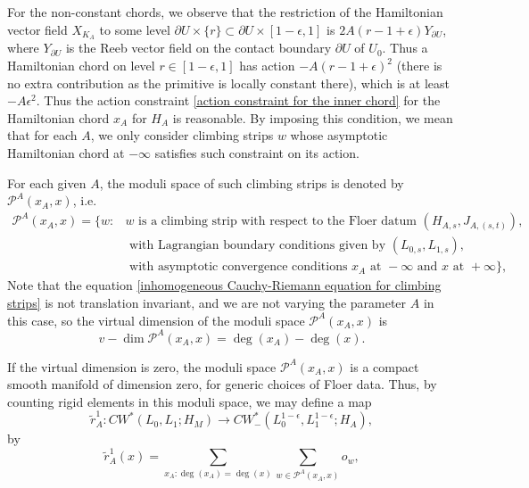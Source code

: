 \documentclass{amsart}
\numberwithin{equation}{section}
\numberwithin{figure}{section}
\begin{document}
For the non-constant chords, we observe that the restriction of the Hamiltonian vector field $X_{K_{A}}$ to some level $\partial U \times \{r\} \subset \partial U \times [1-\epsilon, 1]$ is $2A(r-1+\epsilon)Y_{\partial U}$, where $Y_{\partial U}$ is the Reeb vector field on the contact boundary $\partial U$ of $U_{0}$. Thus a Hamiltonian chord on level $r \in [1-\epsilon, 1]$ has action $-A(r-1+\epsilon)^{2}$ (there is no extra contribution as the primitive is locally constant there), which is at least $-A\epsilon^{2}$. Thus the action constraint \eqref{action constraint for the inner chord} for the Hamiltonian chord $x_{A}$ for $H_{A}$ is reasonable. By imposing this condition, we mean that for each $A$, we only consider climbing strips $w$ whose asymptotic Hamiltonian chord at $-\infty$ satisfies such constraint on its action. \par
	For each given $A$, the moduli space of such climbing strips is denoted by $\mathcal{P}^{A}(x_{A}, x)$, i.e.
\begin{equation}
\begin{split}
\mathcal{P}^{A}(x_{A}, x) = \{w: 
& w \text{ is a climbing strip with respect to the Floer datum } (H_{A, s}, J_{A, (s, t)}),\\
& \text{ with Lagrangian boundary conditions given by } (L_{0, s}, L_{1, s}),\\
& \text{ with asymptotic convergence conditions } x_{A} \text{ at } -\infty \text{ and } x \text{ at } +\infty\},
\end{split}
\end{equation}
Note that the equation \eqref{inhomogeneous Cauchy-Riemann equation for climbing strips} is not translation invariant, and we are not varying the parameter $A$ in this case, so the virtual dimension of the moduli space $\mathcal{P}^{A}(x_{A}, x)$ is
\begin{equation*}
v-\dim \mathcal{P}^{A}(x_{A}, x) = \deg(x_{A}) - \deg(x).
\end{equation*} \par
	If the virtual dimension is zero, the moduli space $\mathcal{P}^{A}(x_{A}, x)$ is a compact smooth manifold of dimension zero, for generic choices of Floer data. Thus, by counting rigid elements in this moduli space, we may define a map
\begin{equation}
\tilde{r}^{1}_{A}: CW^{*}(L_{0}, L_{1}; H_{M}) \to CW^{*}_{-}(L_{0}^{1-\epsilon}, L_{1}^{1-\epsilon}; H_{A}),
\end{equation}
by
\begin{equation}
\tilde{r}^{1}_{A}(x) = \sum_{x_{A}: \deg(x_{A}) = \deg(x)} \sum_{w \in \mathcal{P}^{A}(x_{A}, x)} o_{w},
\end{equation}
\end{document}
